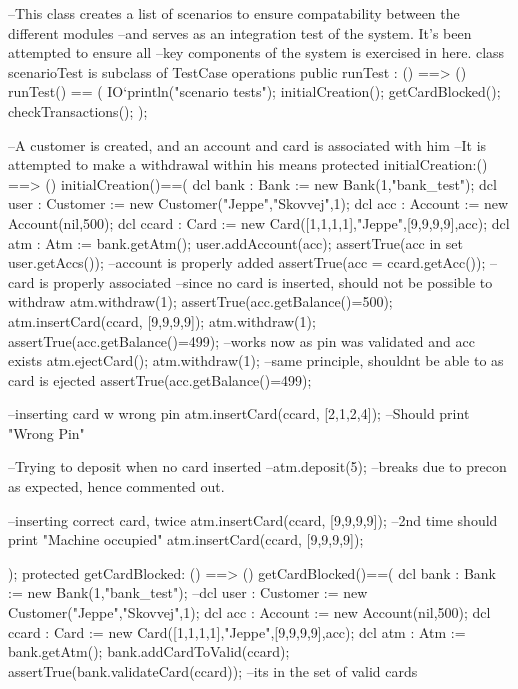 \documentclass[a4paper]{article}
\begin{document}
\title{}
\author{}
\begin{vdm_al}
--This class creates a list of scenarios to ensure compatability between the different modules
--and serves as an integration test of the system. It's been attempted to ensure all
--key components of the system is exercised in here. 
class scenarioTest is subclass of TestCase 
operations
    public runTest : () ==> ()
    runTest() == (
        IO`println("scenario tests");
        initialCreation();
        getCardBlocked();
        checkTransactions();
    );

    --A customer is created, and an account and card is associated with him
    --It is attempted to make a withdrawal within his means
    protected initialCreation:() ==> ()
    initialCreation()==(
        dcl bank : Bank := new Bank(1,"bank_test");
        dcl user : Customer := new Customer("Jeppe","Skovvej",1);
        dcl acc : Account := new Account(nil,500);
        dcl ccard : Card := new Card([1,1,1,1],"Jeppe",[9,9,9,9],acc);
        dcl atm : Atm := bank.getAtm();
        user.addAccount(acc);
        assertTrue(acc in set user.getAccs()); --account is properly added
        assertTrue(acc = ccard.getAcc()); --card is properly associated
        --since no card is inserted, should not be possible to withdraw
        atm.withdraw(1);
        assertTrue(acc.getBalance()=500);
        atm.insertCard(ccard, [9,9,9,9]);
        atm.withdraw(1);
        assertTrue(acc.getBalance()=499); --works now as pin was validated and acc exists
        atm.ejectCard();
        atm.withdraw(1); --same principle, shouldnt be able to as card is ejected
        assertTrue(acc.getBalance()=499);

        --inserting card w wrong pin
        atm.insertCard(ccard, [2,1,2,4]); --Should print "Wrong Pin"

        --Trying to deposit when no card inserted
        --atm.deposit(5); --breaks due to precon as expected, hence commented out. 
        
        --inserting correct card, twice
        atm.insertCard(ccard, [9,9,9,9]);
        --2nd time should print "Machine occupied"
        atm.insertCard(ccard, [9,9,9,9]);

    );
    protected getCardBlocked: () ==> ()
    getCardBlocked()==(
        dcl bank : Bank := new Bank(1,"bank_test");
        --dcl user : Customer := new Customer("Jeppe","Skovvej",1);
        dcl acc : Account := new Account(nil,500);
        dcl ccard : Card := new Card([1,1,1,1],"Jeppe",[9,9,9,9],acc);
        dcl atm : Atm := bank.getAtm();
        bank.addCardToValid(ccard);
        assertTrue(bank.validateCard(ccard)); --its in the set of valid cards
        

\end{vdm_al}
\end{document}
